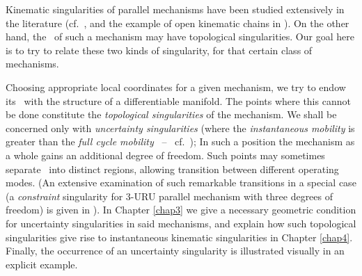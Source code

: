 Kinematic singularities of parallel mechanisms have been studied
extensively in the literature (cf.\ \cite{Hu2}, and the example of
open kinematic chains in \cite{Hu1,WW}). On the other hand, the
\cspace\ of such a mechanism may have topological singularities.
Our goal here is to try to relate these two kinds of singularity,
for that certain class of mechanisms.

Choosing appropriate local coordinates for a given mechanism, we
try to endow its \cspace \ with the structure of a differentiable
manifold. The points where this cannot be done constitute the
\emph{topological singularities} of the mechanism. We shall be
concerned only with \emph{uncertainty singularities} (where  the
\emph{instantaneous mobility} is greater than the \emph{full cycle
mobility} \ -- \ cf.\ \cite{Hu2}); In such a position the
mechanism as a whole gains an additional degree of freedom. Such
points may sometimes separate \cspace \ into distinct regions,
allowing transition between different operating modes. (An
extensive examination of such remarkable transitions in a special
case (a \emph{constraint} singularity for $3$-URU parallel
mechanism with three degrees of freedom) is given in \cite{ZBC}).
In Chapter \ref{chap3} we give a necessary geometric condition for
uncertainty singularities in said mechanisms, and explain how such
topological singularities give rise to instantaneous kinematic
singularities in Chapter \ref{chap4}. Finally, the occurrence of
an uncertainty singularity is illustrated visually in an explicit
example.






